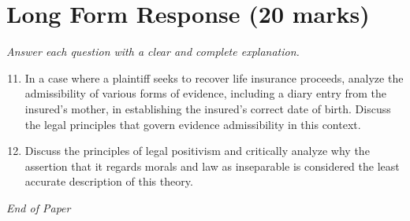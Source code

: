 \documentclass[12pt]{article}
\begin{document}
\section*{Long Form Response (20 marks)}
\textit{Answer each question with a clear and complete explanation.}
\begin{enumerate}[label=\arabic*.]
\setcounter{enumi}{10}
\item In a case where a plaintiff seeks to recover life insurance proceeds, analyze the admissibility of various forms of evidence, including a diary entry from the insured's mother, in establishing the insured's correct date of birth. Discuss the legal principles that govern evidence admissibility in this context.
\item Discuss the principles of legal positivism and critically analyze why the assertion that it regards morals and law as inseparable is considered the least accurate description of this theory.
\end{enumerate}

\vfill
\noindent\textit{End of Paper}
\end{document}
